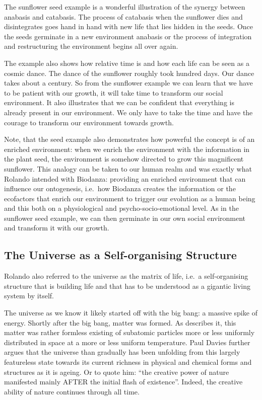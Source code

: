 \documentclass[
  11pt,
]{book}
\begin{document}
The sunflower seed example is a wonderful illustration of the synergy between anabasis and catabasis. The process of catabasis when the sunflower dies and disintegrates goes hand in hand with new life that lies hidden in the seeds. Once the seeds germinate in a new environment anabasis or the process of integration and restructuring the environment begins all over again.

The example also shows how relative time is and how each life can be seen as a cosmic dance. The dance of the sunflower roughly took hundred days. Our dance takes about a century. So from the sunflower example we can learn that we have to be patient with our growth, it will take time to transform our social environment. It also illustrates that we can be confident that everything is already present in our environment. We only have to take the time and have the courage to transform our environment towards growth.

Note, that the seed example also demonstrates how powerful the concept is of an enriched environment: when we enrich the environment with the information in the plant seed, the environment is somehow directed to grow this magnificent sunflower. This analogy can be taken to our human realm and was exactly what Rolando intended with Biodanza: providing an enriched environment that can influence our ontogenesis, i.e.~how Biodanza creates the information or the ecofactors that enrich our environment to trigger our evolution as a human being and this both on a physiological and psycho-socio-emotional level. As in the sunflower seed example, we can then germinate in our own social environment and transform it with our growth.

\hypertarget{the-universe-as-a-self-organising-structure}{%
\subsection{The Universe as a Self-organising Structure}\label{the-universe-as-a-self-organising-structure}}

Rolando also referred to the universe as the matrix of life, i.e.~a self-organising structure that is building life and that has to be understood as a gigantic living system by itself.

The universe as we know it likely started off with the big bang: a massive spike of energy. Shortly after the big bang, matter was formed. As \citet{davies1987} describes it, this matter was rather formless existing of subatomic particles more or less uniformly distributed in space at a more or less uniform temperature.
Paul Davies further argues that the universe than gradually has been unfolding from this largely featureless state towards its current richness in physical and chemical forms and structures as it is ageing. Or to quote him: ``the creative power of nature manifested mainly AFTER the initial flash of existence''. Indeed, the creative ability of nature continues through all time.
\end{document}
